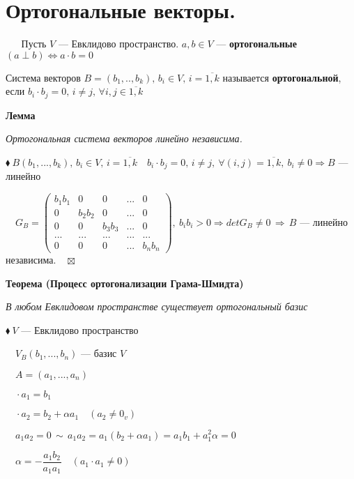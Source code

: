 \documentclass[a4paper, 12pt]{report}
\begin{document}
	
	
	
	
	
	
	\section{Ортогональные векторы.}
	$\quad\;$ Пусть $V$ --- Евклидово пространство.
	$a, b \in V$ --- \textbf{ортогональные} $(a \perp b) \Longleftrightarrow a \cdot b=0$
	
	Система векторов $B=(b_1,..,b_k), \, b_i \in V, \, i=\overline{1,k}$ называется \textbf{ортогональной}, если $b_i \cdot b_j = 0, \, i \ne j, \, \forall i,j \in \overline{1,k}$
	\par \bigskip
	\textbf{Лемма}
	
	\textit{Ортогональная система векторов линейно независима.}
	\par \bigskip
	$\blacklozenge\ B(b_1,...,b_k), \, b_i \in V, \, i=\overline{1,k} \quad b_i \cdot b_j=0, \, i \ne j,\ \forall(i,j)=\overline{1,k},\ b_i \ne 0 \Rightarrow B$ --- линейно
	
	\par \bigskip 
	$\quad G_B=\begin{pmatrix}
		b_{1}b_1&0&0&...&0\\
		0&b_{2}b_2&0&...&0\\
		0&0&b_{3}b_3&...&0\\
		...&...&...&...&...\\
		0&0&0&...&b_{n}b_n
	\end{pmatrix},\ b_{i}b_i>0\Rightarrow det G_B \ne 0 \, \Rightarrow \, B$ --- линейно независима.$\quad \boxtimes$
	\par \bigskip
	\textbf{Теорема (Процесс ортогонализации Грама-Шмидта)}
	
	\textit{В любом Евклидовом пространстве существует ортогональный базис}
	\par \bigskip
	$\blacklozenge\ V$ --- Евклидово пространство
	
	$\quad V_B(b_1,...,b_n)$ --- базис $V$
	
	$\quad A=(a_1,...,a_n)$
	
	$\quad \cdot a_1=b_1$
	
	$\quad \cdot a_2=b_2+\alpha a_1 \quad (a_2 \ne 0_v)$
	
	$\quad a_1 a_2 =0 \, \sim \, a_1 a_2 = a_1(b_2 + \alpha a_1) = a_1 b_1 + a_1^2 \alpha =0$
	
	$\quad \alpha = - \dfrac{a_1 b_2}{a_1 a_1} \quad (a_1 \cdot a_1 \ne 0)$
	
\end{document}
